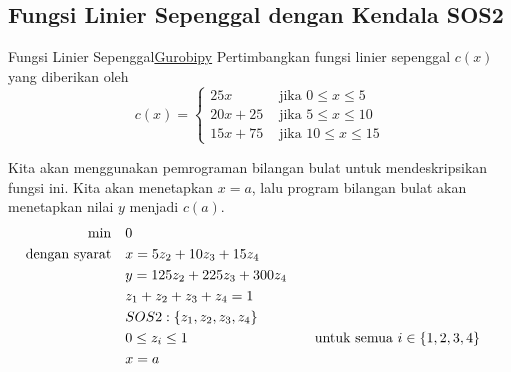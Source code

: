 \subsection{Fungsi Linier Sepenggal dengan Kendala SOS2}
\label{subsec:pwl-sos2}
\begin{examplewithcode}{Fungsi Linier Sepenggal}{\href{https://github.com/open-optimization/open-optimization-or-examples/blob/master/nonlinear-programming/Gurobi-SOS-Examples.ipynb}{Gurobipy}}
\label{example:pwl}
Pertimbangkan fungsi linier sepenggal
 $c(x)$ yang diberikan oleh
$$
c(x) = 
\begin{cases}
25x  & \text{ jika } 0 \leq x \leq 5\\
20x + 25 & \text{ jika } 5 \leq x \leq 10\\
15x + 75 & \text{ jika } 10 \leq x \leq 15
\end{cases}
$$
\begin{center}
\par{}\label{fig:pwl-plot}%

\end{center}

Kita akan menggunakan pemrograman bilangan bulat untuk mendeskripsikan fungsi ini. Kita akan menetapkan $x = a$, lalu program bilangan bulat akan menetapkan nilai $y$ menjadi $c(a)$.
\begin{align*}
\min \quad & 0 \\
\mbox{dengan syarat}\quad        & x = 5 z_{2} +10 z_{3} + 15 z_{4} \\
 & y = 125 z_{2} + 225 z_{3} + 300 z_{4} \\
 & z_{1} + z_{2} + z_{3} + z_{4} = 1 \\
 & SOS2: \{z_1, z_2, z_3, z_4\} \\
 & 0 \leq z_{i} \leq 1 &&\quad \mbox{untuk semua } i \in \{1,2,3,4\} \\
 & x = a \\
\end{align*}

\end{examplewithcode}

